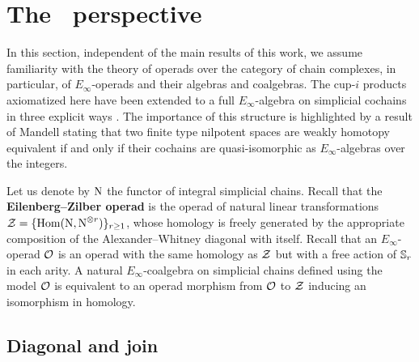 
\section{The \pdfEinfty\ perspective}\label{s:operads}

In this section, independent of the main results of this work, we assume familiarity with the theory of operads over the category of chain complexes, in particular, of $E_\infty$-operads and their algebras and coalgebras.
The cup-$i$ products axiomatized here have been extended to a full $E_\infty$-algebra on simplicial cochains in three explicit ways \cite{mcclure2003multivariable,berger2004combinatorial,medina2020prop1}.
The importance of this structure is highlighted by a result of Mandell \cite{mandell2006homotopy_type} stating that two finite type nilpotent spaces are weakly homotopy equivalent if and only if their cochains are quasi-isomorphic as $E_\infty$-algebras over the integers.

Let us denote by $\operatorname{N}$ the functor of integral simplicial chains.
Recall that the \textbf{Eilenberg--Zilber operad} is the operad of natural linear transformations $\mathcal{Z} = \{\mathrm{Hom}(\operatorname{N}, \operatorname{N}^{\otimes r})\}_{r\geq1}$, whose homology is freely generated by the appropriate composition of the Alexander--Whitney diagonal with itself.
Recall that an $E_\infty$-operad $\mathcal{O}$ is an operad with the same homology as $\mathcal{Z}$ but with a free action of $\mathbb{S}_r$ in each arity.
A natural $E_\infty$-coalgebra on simplicial chains defined using the model $\mathcal{O}$ is equivalent to an operad morphism from $\mathcal{O}$ to $\mathcal{Z}$ inducing an isomorphism in homology.


\subsection{Diagonal and join}

